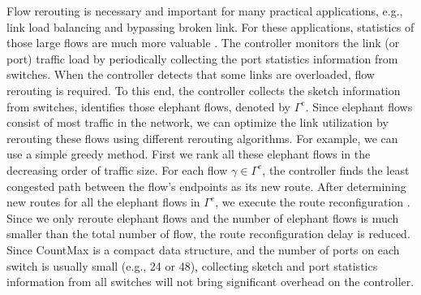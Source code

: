Flow rerouting is necessary and important for many practical applications, e.g., link load balancing and bypassing broken link\cite{xu2017incremental}. For these applications, statistics of those large flows are much more valuable \cite{xu2017scalable}. The controller monitors the link (or port) traffic load by periodically collecting the port statistics information from switches. When the controller detects that some links are overloaded, flow rerouting is required. To this end, the controller collects the sketch information from switches, identifies those elephant flows, denoted by $\Gamma^e$. Since elephant flows consist of most traffic in the network, we can optimize the link utilization by rerouting these flows using different rerouting algorithms. For example, we can use a simple greedy method. First we rank all these elephant flows in the decreasing order of traffic size. For each flow $\gamma \in \Gamma^e$, the controller finds the least congested path between the flow's endpoints as its new route. After determining new routes for all the elephant flows in $\Gamma^e$, we execute the route reconfiguration \cite{jin2014dynamic} \cite{xu2017joint}. Since we only reroute elephant flows and the number of elephant flows is much smaller than the total number of flow, the route reconfiguration delay is reduced. Since CountMax is a compact data structure, and the number of ports on each switch is usually small (e.g., 24 or 48), collecting sketch and port statistics information from all switches will not bring significant overhead on the controller.






